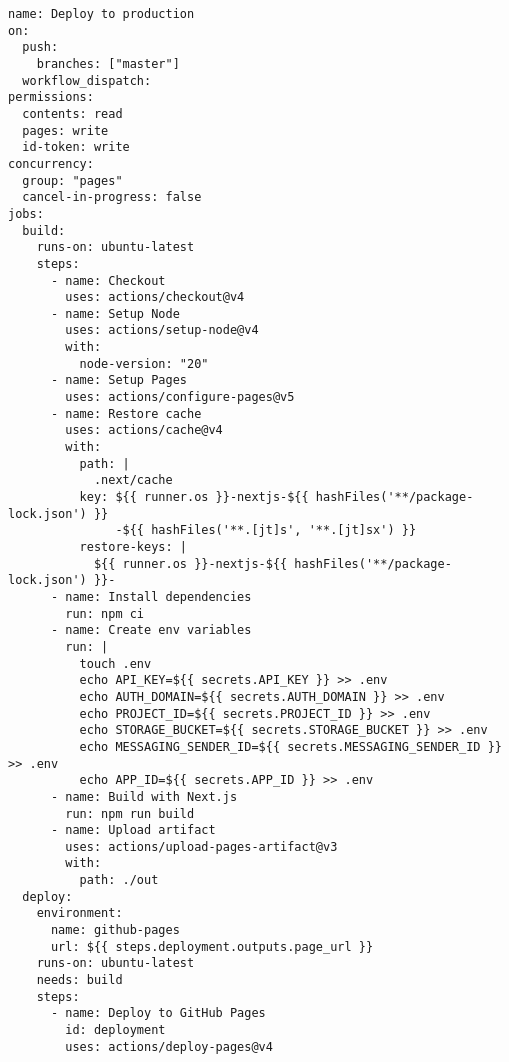 \begin{verbatim}
name: Deploy to production
on:
  push:
    branches: ["master"]
  workflow_dispatch:
permissions:
  contents: read
  pages: write
  id-token: write
concurrency:
  group: "pages"
  cancel-in-progress: false
jobs:
  build:
    runs-on: ubuntu-latest
    steps:
      - name: Checkout
        uses: actions/checkout@v4
      - name: Setup Node
        uses: actions/setup-node@v4
        with:
          node-version: "20"
      - name: Setup Pages
        uses: actions/configure-pages@v5
      - name: Restore cache
        uses: actions/cache@v4
        with:
          path: |
            .next/cache
          key: ${{ runner.os }}-nextjs-${{ hashFiles('**/package-lock.json') }}
               -${{ hashFiles('**.[jt]s', '**.[jt]sx') }}
          restore-keys: |
            ${{ runner.os }}-nextjs-${{ hashFiles('**/package-lock.json') }}-
      - name: Install dependencies
        run: npm ci
      - name: Create env variables
        run: |
          touch .env
          echo API_KEY=${{ secrets.API_KEY }} >> .env
          echo AUTH_DOMAIN=${{ secrets.AUTH_DOMAIN }} >> .env
          echo PROJECT_ID=${{ secrets.PROJECT_ID }} >> .env
          echo STORAGE_BUCKET=${{ secrets.STORAGE_BUCKET }} >> .env
          echo MESSAGING_SENDER_ID=${{ secrets.MESSAGING_SENDER_ID }} >> .env
          echo APP_ID=${{ secrets.APP_ID }} >> .env
      - name: Build with Next.js
        run: npm run build
      - name: Upload artifact
        uses: actions/upload-pages-artifact@v3
        with:
          path: ./out
  deploy:
    environment:
      name: github-pages
      url: ${{ steps.deployment.outputs.page_url }}
    runs-on: ubuntu-latest
    needs: build
    steps:
      - name: Deploy to GitHub Pages
        id: deployment
        uses: actions/deploy-pages@v4
\end{verbatim}
